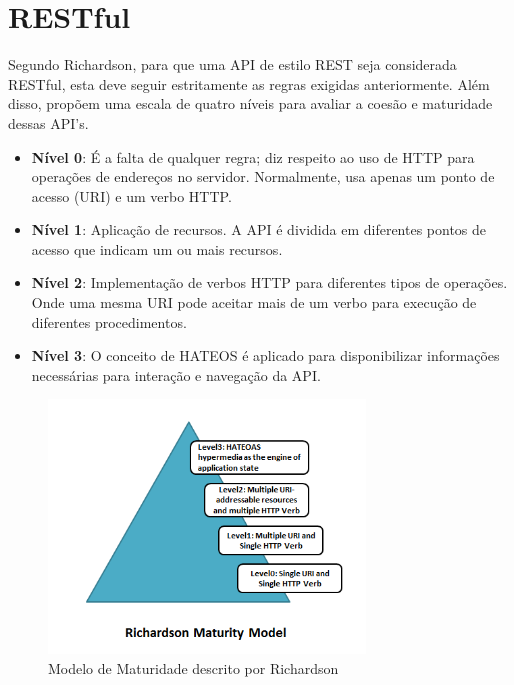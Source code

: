 \section[RESTful]{RESTful}

Segundo Richardson, para que uma API de estilo REST seja considerada RESTful, esta deve seguir estritamente as regras exigidas anteriormente. Além disso, propõem uma escala de quatro níveis para avaliar a coesão e maturidade dessas API's. \cite{RichardsonEtAl2013}

\begin{itemize}[noitemsep]
\item \textbf{Nível 0}: É a falta de qualquer regra; diz respeito ao uso de HTTP para operações de endereços no servidor. Normalmente, usa apenas um ponto de acesso (URI) e um verbo HTTP.
\item \textbf{Nível 1}: Aplicação de recursos. A API é dividida em diferentes pontos de acesso que indicam um ou mais recursos.
\item \textbf{Nível 2}: Implementação de verbos HTTP para diferentes tipos de operações. Onde uma mesma URI pode aceitar mais de um verbo para execução de diferentes procedimentos.
\item \textbf{Nível 3}: O conceito de HATEOS é aplicado para disponibilizar informações necessárias para interação e navegação da API.
\end{itemize}

\begin{figure}[H]
  \centering
  \includegraphics[width=0.75\textwidth,height=\textheight,keepaspectratio]{figuras/richardson-maturity-model.png}
  \caption{Modelo de Maturidade descrito por Richardson}
\end{figure}
